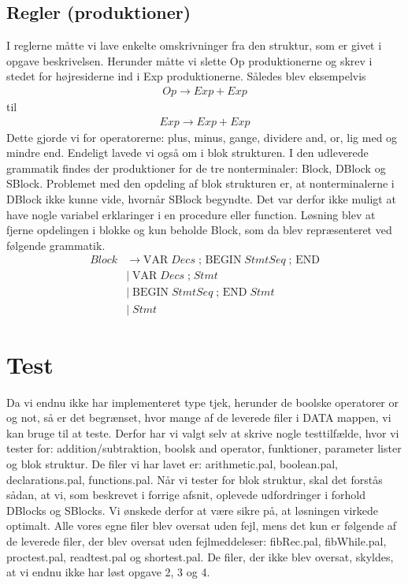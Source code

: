 \documentclass[11pt,a4paper]{article}
\begin{document}
\subsection*{Regler (produktioner)}
I reglerne måtte vi lave enkelte omskrivninger fra den struktur,
som er givet i opgave beskrivelsen. Herunder måtte vi slette Op produktionerne
og skrev i stedet for højresiderne ind i Exp produktionerne.
Således  blev eksempelvis
\begin{align*}
    Op \rightarrow Exp + Exp
\end{align*}
til
\begin{align*}
    Exp \rightarrow Exp + Exp
\end{align*}
Dette gjorde vi for operatorerne: plus, minus, gange, dividere
and, or, lig med og mindre end. Endeligt lavede vi også om
i blok strukturen. I den udleverede grammatik findes der produktioner
for de tre nonterminaler: Block, DBlock og SBlock. Problemet med den
opdeling af blok strukturen er, at nonterminalerne i DBlock ikke kunne
vide, hvornår SBlock begyndte. Det var derfor ikke muligt at have nogle
variabel erklaringer i en procedure eller function. Løsning blev at
fjerne opdelingen i blokke og kun beholde Block, som da blev repræsenteret
ved følgende grammatik.
\begin{align*}
    Block &\rightarrow \text{VAR} \; Decs \; \text{; BEGIN} \; StmtSeq \; \text{; END}\\
    &\text{|} \; \text{VAR} \; Decs \; \text{;} \; Stmt\\ 
    &\text{|} \; \text{BEGIN} \; StmtSeq \; \text{; END} \; Stmt\\ 
    &\text{|} \; Stmt
\end{align*}
\section*{Test}
Da vi endnu ikke har implementeret type tjek, herunder de boolske operatorer
or og not, så er det begrænset, hvor mange af de leverede filer i DATA mappen,
vi kan bruge til at teste. Derfor har vi valgt selv at skrive nogle testtilfælde,
hvor vi tester for: addition/subtraktion, boolsk and operator, funktioner,
parameter lister og blok struktur. De filer vi har lavet er: arithmetic.pal,
boolean.pal, declarations.pal, functions.pal. Når vi tester for blok struktur,
skal det forstås sådan, at vi, som beskrevet i forrige afsnit, oplevede
udfordringer i forhold DBlocks og SBlocks. Vi ønskede derfor at være sikre på, at 
løsningen virkede optimalt. Alle vores egne filer blev oversat uden fejl, mens
det kun er følgende af de leverede filer, der blev oversat uden fejlmeddeleser:
fibRec.pal, fibWhile.pal, proctest.pal, readtest.pal og shortest.pal. De filer,
der ikke blev oversat, skyldes, at vi endnu ikke har løst opgave 2, 3 og 4.
\end{document}
